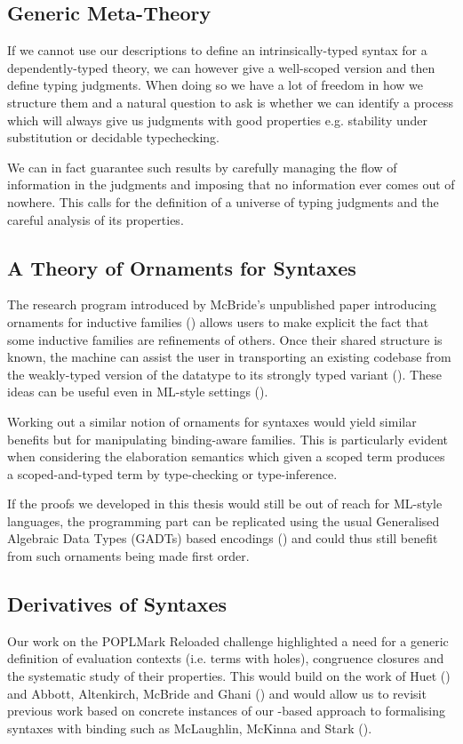 \subsection{Generic Meta-Theory}

If we cannot use our descriptions to define an intrinsically-typed syntax for
a dependently-typed theory, we can however give a well-scoped version and then
define typing judgments. When doing so we have a lot of freedom in how we
structure them and a natural question to ask is whether we can identify a process
which will always give us judgments with good properties e.g. stability under
substitution or decidable typechecking.

We can in fact guarantee such results by carefully managing the flow of information
in the judgments and imposing that no information ever comes out of nowhere. This
calls for the definition of a universe of typing judgments and the careful analysis
of its properties.

\subsection{A Theory of Ornaments for Syntaxes}

The research program introduced by McBride's unpublished paper introducing
ornaments for inductive families (\citeyear{mcbride2010ornamental}) allows users
to make explicit the fact that some inductive families are refinements of others.
Once their shared structure is known, the machine can assist the user in
transporting an existing codebase from the weakly-typed version of the datatype
to its strongly typed variant (\cite{dagand_mcbride_2014}). These ideas can be
useful even in ML-style settings (\cite{Williams:2014:OP:2633628.2633631}).

Working out a similar notion of ornaments for syntaxes would yield similar
benefits but for manipulating binding-aware families. This is particularly
evident when considering the elaboration semantics which given a scoped term
produces a scoped-and-typed term by type-checking or type-inference.

If the proofs we developed in this thesis would still be out of reach for
ML-style languages, the programming part can be replicated using the usual
Generalised Algebraic Data Types (GADTs) based encodings
(\cite{danvytagless,lindley2014hasochism}) and could thus still benefit from
such ornaments being made first order.

\subsection{Derivatives of Syntaxes}

Our work on the POPLMark Reloaded challenge highlighted a need for a generic
definition of evaluation contexts (i.e. terms with holes), congruence closures
and the systematic study of their properties. This would build on the work of
Huet (\citeyear{huet_1997}) and Abbott, Altenkirch, McBride and Ghani
(\citeyear{abbott2005data}) and would allow us to revisit previous work
based on concrete instances of our -based approach to formalising
syntaxes with binding such as McLaughlin, McKinna and Stark (\citeyear{craig2018triangle}).
